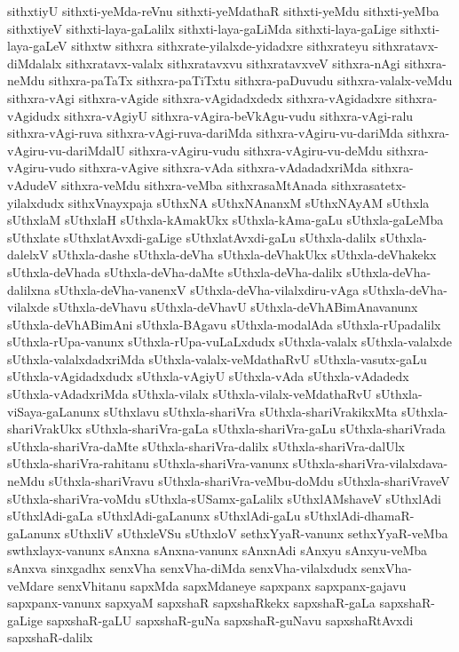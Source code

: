 {sithxtiyU
sithxti-yeMda-reVnu
sithxti-yeMdathaR
sithxti-yeMdu
sithxti-yeMba
sithxtiyeV
sithxti-laya-gaLalilx
sithxti-laya-gaLiMda
sithxti-laya-gaLige
sithxti-laya-gaLeV
sithxtw
sithxra
sithxrate-yilalxde-yidadxre
sithxrateyu
sithxratavx-diMdalalx
sithxratavx-valalx
sithxratavxvu
sithxratavxveV
sithxra-nAgi
sithxra-neMdu
sithxra-paTaTx
sithxra-paTiTxtu
sithxra-paDuvudu
sithxra-valalx-veMdu
sithxra-vAgi
sithxra-vAgide
sithxra-vAgidadxdedx
sithxra-vAgidadxre
sithxra-vAgidudx
sithxra-vAgiyU
sithxra-vAgira-beVkAgu-vudu
sithxra-vAgi-ralu
sithxra-vAgi-ruva
sithxra-vAgi-ruva-dariMda
sithxra-vAgiru-vu-dariMda
sithxra-vAgiru-vu-dariMdalU
sithxra-vAgiru-vudu
sithxra-vAgiru-vu-deMdu
sithxra-vAgiru-vudo
sithxra-vAgive
sithxra-vAda
sithxra-vAdadadxriMda
sithxra-vAdudeV
sithxra-veMdu
sithxra-veMba
sithxrasaMtAnada
sithxrasatetx-yilalxdudx
sithxVnayxpaja
sUthxNA
sUthxNAnanxM
sUthxNAyAM
sUthxla
sUthxlaM
sUthxlaH
sUthxla-kAmakUkx
sUthxla-kAma-gaLu
sUthxla-gaLeMba
sUthxlate
sUthxlatAvxdi-gaLige
sUthxlatAvxdi-gaLu
sUthxla-dalilx
sUthxla-dalelxV
sUthxla-dashe
sUthxla-deVha
sUthxla-deVhakUkx
sUthxla-deVhakekx
sUthxla-deVhada
sUthxla-deVha-daMte
sUthxla-deVha-dalilx
sUthxla-deVha-dalilxna
sUthxla-deVha-vanenxV
sUthxla-deVha-vilalxdiru-vAga
sUthxla-deVha-vilalxde
sUthxla-deVhavu
sUthxla-deVhavU
sUthxla-deVhABimAnavanunx
sUthxla-deVhABimAni
sUthxla-BAgavu
sUthxla-modalAda
sUthxla-rUpadalilx
sUthxla-rUpa-vanunx
sUthxla-rUpa-vuLaLxdudx
sUthxla-valalx
sUthxla-valalxde
sUthxla-valalxdadxriMda
sUthxla-valalx-veMdathaRvU
sUthxla-vasutx-gaLu
sUthxla-vAgidadxdudx
sUthxla-vAgiyU
sUthxla-vAda
sUthxla-vAdadedx
sUthxla-vAdadxriMda
sUthxla-vilalx
sUthxla-vilalx-veMdathaRvU
sUthxla-viSaya-gaLanunx
sUthxlavu
sUthxla-shariVra
sUthxla-shariVrakikxMta
sUthxla-shariVrakUkx
sUthxla-shariVra-gaLa
sUthxla-shariVra-gaLu
sUthxla-shariVrada
sUthxla-shariVra-daMte
sUthxla-shariVra-dalilx
sUthxla-shariVra-dalUlx
sUthxla-shariVra-rahitanu
sUthxla-shariVra-vanunx
sUthxla-shariVra-vilalxdava-neMdu
sUthxla-shariVravu
sUthxla-shariVra-veMbu-doMdu
sUthxla-shariVraveV
sUthxla-shariVra-voMdu
sUthxla-sUSamx-gaLalilx
sUthxlAMshaveV
sUthxlAdi
sUthxlAdi-gaLa
sUthxlAdi-gaLanunx
sUthxlAdi-gaLu
sUthxlAdi-dhamaR-gaLanunx
sUthxliV
sUthxleVSu
sUthxloV
sethxYyaR-vanunx
sethxYyaR-veMba
swthxlayx-vanunx
sAnxna
sAnxna-vanunx
sAnxnAdi
sAnxyu
sAnxyu-veMba
sAnxva
sinxgadhx
senxVha
senxVha-diMda
senxVha-vilalxdudx
senxVha-veMdare
senxVhitanu
sapxMda
sapxMdaneye
sapxpanx
sapxpanx-gajavu
sapxpanx-vanunx
sapxyaM
sapxshaR
sapxshaRkekx
sapxshaR-gaLa
sapxshaR-gaLige
sapxshaR-gaLU
sapxshaR-guNa
sapxshaR-guNavu
sapxshaRtAvxdi
sapxshaR-dalilx
}
